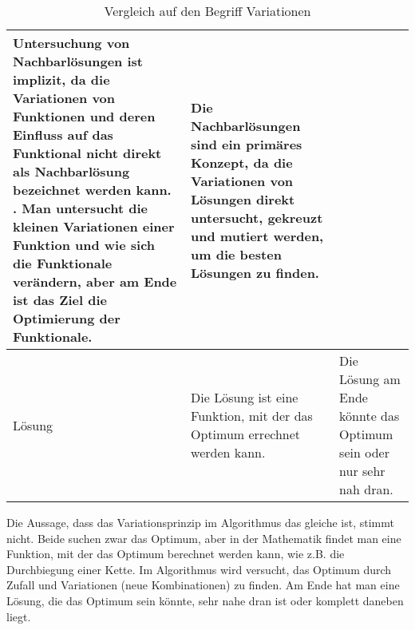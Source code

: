 \begin{table}[h]
\begin{tabularx}{\textwidth}{|X|X|X|}
{         Untersuchung von Nachbarlösungen ist implizit, da die Variationen 
         von Funktionen und deren Einfluss auf das Funktional nicht direkt 
         als Nachbarlösung bezeichnet werden kann.
      }. Man untersucht die kleinen Variationen einer Funktion und wie sich 
      die Funktionale verändern, aber am Ende ist das Ziel die Optimierung 
      der Funktionale.
       & Die Nachbarlösungen sind ein primäres Konzept, da die Variationen
      von Lösungen direkt untersucht, gekreuzt und mutiert werden, um die 
      besten Lösungen zu finden.
      \\ \hline
      Lösung
       & Die Lösung ist eine Funktion, mit der das Optimum errechnet werden kann.
       & Die Lösung am Ende könnte das Optimum sein oder nur sehr nah dran.
      \\ \hline
   \end{tabularx}
   \caption{Vergleich auf den Begriff Variationen}
   \label{tab:example_bruteforce_cities}
\end{table}

Die Aussage, dass das Variationsprinzip im Algorithmus das gleiche ist, 
stimmt nicht. Beide suchen zwar das Optimum, aber in der Mathematik findet 
man eine Funktion, mit der das Optimum berechnet werden kann, wie z.B. 
die Durchbiegung einer Kette. Im Algorithmus wird versucht, das Optimum 
durch Zufall und Variationen (neue Kombinationen) zu finden. Am Ende 
hat man eine Lösung, die das Optimum sein könnte, sehr nahe dran ist 
oder komplett daneben liegt.
